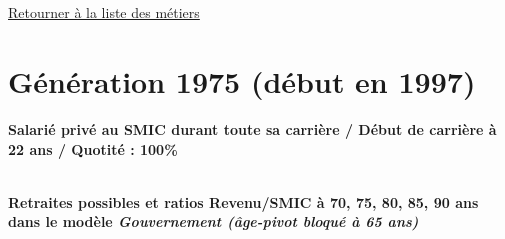 ~\\ 
 


   
 \localtableofcontents 

~\\ 
 
 \hyperlink{page.2}{\noindent Retourner à la liste des métiers}

 \newpage 

\section{Génération 1975 (début en 1997)\label{SMIC_100_22_1975_0}} 
 
{\bf \noindent Salarié privé au SMIC durant toute sa carrière / Début de carrière à 22 ans / Quotité : 100\%}  ~ 

 ~\\{\bf \noindent Retraites possibles et ratios Revenu/SMIC à 70, 75, 80, 85, 90 ans dans le modèle \emph{Gouvernement (âge-pivot bloqué à 65 ans)}}  
 
